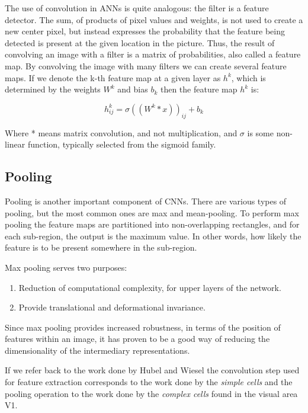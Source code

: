 \documentclass[11pt]{article}
\begin{document}
The use of convolution in ANNs is quite analogous: the filter is a feature detector. The sum, of products of pixel values and weights, is not used to create a new center pixel, but instead expresses the probability that the feature being detected is present at the given location in the picture.  Thus, the result of convolving an image with a filter is a matrix of probabilities, also called a feature map.  By convolving the image with many filters we can create several feature maps.  If we denote the k-th feature map at a given layer as $h^k$, which is determined by the weights $W^k$ and bias $b_k$ then the feature map $h^k$ is:

\begin{displaymath}
  h^{k}_{ij} = \sigma((W^k * x))_{ij} + b_k
\end{displaymath}

Where * means matrix convolution, and not multiplication, and $\sigma$ is some non-linear function, typically selected from the sigmoid family.

\subsection{Pooling}

Pooling is another important component of CNNs.  There are various types of pooling, but the most common ones are max and mean-pooling.  To perform max pooling the feature maps are partitioned into non-overlapping rectangles, and for each sub-region, the output is the maximum value.  In other words, how likely the feature is to be present somewhere in the sub-region.

Max pooling serves two purposes:

\begin{enumerate}
\item Reduction of computational complexity, for upper layers of the network.
\item Provide translational and deformational invariance.
\end{enumerate}

Since max pooling provides increased robustness, in terms of the position of features within an image, it has proven to be a good way of reducing the dimensionality of the intermediary representations.

If we refer back to the work done by Hubel and Wiesel the convolution step used for feature extraction corresponds to the work done by the \textit{simple cells} and the pooling operation to the work done by the \textit{complex cells} found in the visual area V1.
\end{document}
